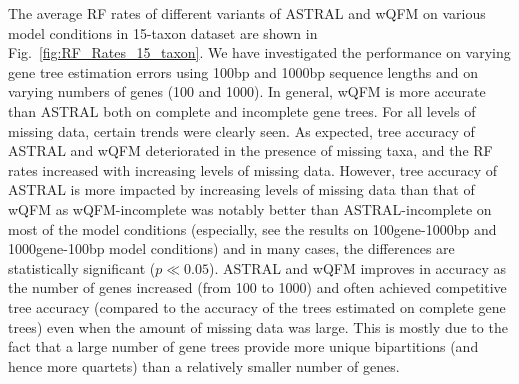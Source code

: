 The average RF rates of different variants of ASTRAL and wQFM on various model conditions in 15-taxon dataset are shown in Fig.~\ref{fig:RF_Rates_15_taxon}. We have investigated the performance on varying gene tree estimation errors using 100bp and 1000bp sequence lengths and on varying numbers of genes (100 and 1000). In general, wQFM is more accurate than ASTRAL both on complete and incomplete gene trees. For all levels of missing data, certain trends were clearly seen. As expected, tree accuracy of ASTRAL and wQFM deteriorated in the presence of missing taxa, and the RF rates increased with increasing levels of missing data. However, tree accuracy of ASTRAL is more impacted by increasing levels of missing data than that of wQFM as wQFM-incomplete was notably better than ASTRAL-incomplete on most of the model conditions (especially, see the results on 100gene-1000bp and 1000gene-100bp model conditions) and in many cases, the differences are statistically significant ($p \ll 0.05$). ASTRAL and wQFM improves in accuracy as the number of genes increased (from 100 to 1000) and often achieved competitive tree accuracy (compared to the accuracy of the trees estimated on complete gene trees) even when the amount of missing data was large. This is mostly due to the fact that a  large number of gene trees provide more unique bipartitions (and hence more quartets) than a relatively smaller number of genes.


